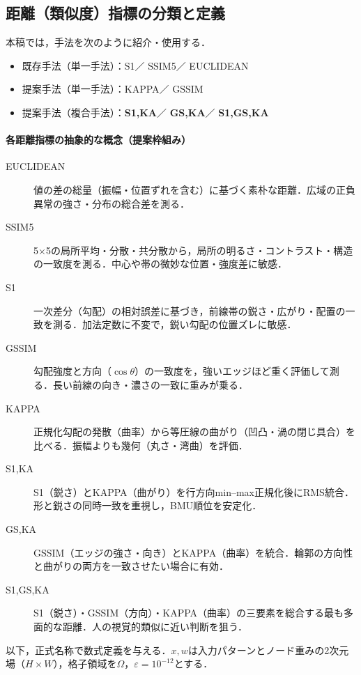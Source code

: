 \documentclass{jarticle}
\theoremstyle{definition}
\begin{document}
\subsection{距離（類似度）指標の分類と定義}
本稿では，手法を次のように紹介・使用する．
\begin{itemize}
  \item 既存手法（単一手法）：S1／ SSIM5／ EUCLIDEAN
  \item 提案手法（単一手法）：KAPPA／ GSSIM
  \item 提案手法（複合手法）：\textbf{S1,KA}／ \textbf{GS,KA}／ \textbf{S1,GS,KA}
\end{itemize}

\paragraph*{各距離指標の抽象的な概念（提案枠組み）}
\begin{description}
\item[EUCLIDEAN] 値の差の総量（振幅・位置ずれを含む）に基づく素朴な距離．広域の正負異常の強さ・分布の総合差を測る．
\item[SSIM5] 5×5の局所平均・分散・共分散から，局所の明るさ・コントラスト・構造の一致度を測る．中心や帯の微妙な位置・強度差に敏感．
\item[S1] 一次差分（勾配）の相対誤差に基づき，前線帯の鋭さ・広がり・配置の一致を測る．加法定数に不変で，鋭い勾配の位置ズレに敏感．
\item[GSSIM] 勾配強度と方向（$\cos\theta$）の一致度を，強いエッジほど重く評価して測る．長い前線の向き・濃さの一致に重みが乗る．
\item[KAPPA] 正規化勾配の発散（曲率）から等圧線の曲がり（凹凸・渦の閉じ具合）を比べる．振幅よりも幾何（丸さ・湾曲）を評価．
\item[S1,KA] S1（鋭さ）とKAPPA（曲がり）を行方向min–max正規化後にRMS統合．形と鋭さの同時一致を重視し，BMU順位を安定化．
\item[GS,KA] GSSIM（エッジの強さ・向き）とKAPPA（曲率）を統合．輪郭の方向性と曲がりの両方を一致させたい場合に有効．
\item[S1,GS,KA] S1（鋭さ）・GSSIM（方向）・KAPPA（曲率）の三要素を総合する最も多面的な距離．人の視覚的類似に近い判断を狙う．
\end{description}

以下，正式名称で数式定義を与える．$x,w$は入力パターンとノード重みの2次元場（$H\times W$），格子領域を$\Omega$，$\varepsilon=10^{-12}$とする．
\end{document}
